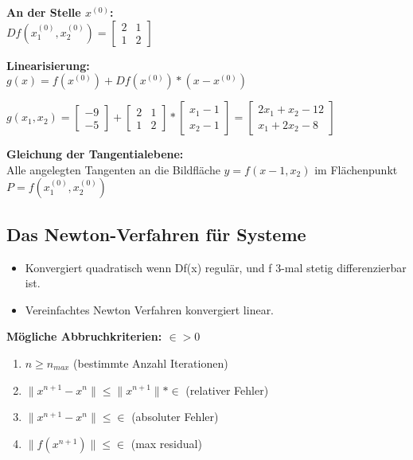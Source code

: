 \documentclass[../ZF_HM2.tex]{subfiles}
\begin{document}
\textbf{An der Stelle $x^{(0)}$: }\\

$Df(x_1^{(0)},x_2^{(0)}) = \left[\begin {matrix}2 & 1\\
1 & 2\end{matrix}\right]$

\textbf{Linearisierung:}\\
$g(x)= f(x^{(0)})+Df(x^{(0)})*(x-x^{(0)})$

$g(x_1,x_2) = \left[\begin {matrix}-9 \\
-5\end{matrix}\right] + \left[\begin {matrix}2 & 1\\
1 & 2\end{matrix}\right] * \left[\begin {matrix}x_1 - 1\\
x_2 -1\end{matrix}\right] = \left[\begin {matrix}2x_1+x_2-12\\
x_1+2x_2-8\end{matrix}\right]$

\textbf{Gleichung der Tangentialebene:} \\
Alle angelegten Tangenten an die Bildfläche $y=f(x-1,x_2)$ im Flächenpunkt $P=f(x_1^{(0)},x_2^{(0)})$

\subsection{Das Newton-Verfahren für Systeme}
\begin{itemize}
	\item Konvergiert quadratisch wenn Df(x) regulär, und f 3-mal stetig differenzierbar ist.
	\item Vereinfachtes Newton Verfahren konvergiert linear.
\end{itemize}

\textbf{Mögliche Abbruchkriterien: $\in > 0$}\\
\begin{enumerate}
	\item $n \geq n_{max}$ (bestimmte Anzahl Iterationen)
	\item $\| x^{n+1}-x^{n}\| \leq \| x^{n+1}\| * \in$ (relativer Fehler)
	\item $\| x^{n+1}-x^{n}\| \leq \in$ (absoluter Fehler)
	\item $\|f(x^{n+1})\| \leq \in$ (max residual)
\end{enumerate}
\end{document}

